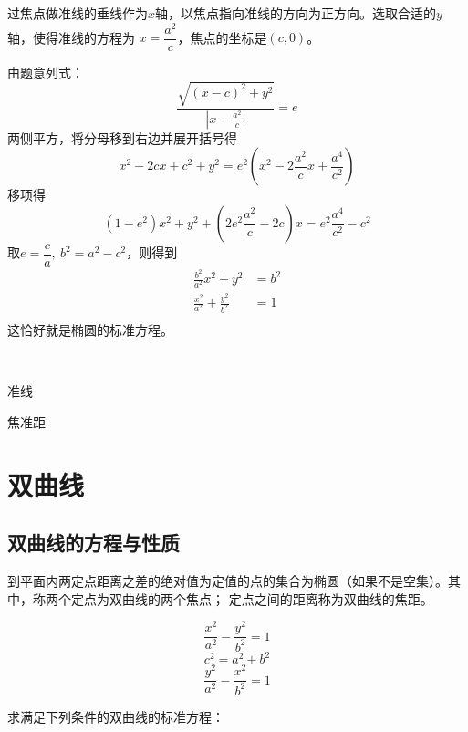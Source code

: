 \begin{jie}
    过焦点做准线的垂线作为\(x\)轴，以焦点指向准线的方向为正方向。选取合适的\(y\)轴，使得准线的方程为
    \(x=\dfrac{a^2}{c}\)，焦点的坐标是\((c,0)\)。
    
    由题意列式：
       \[ \frac{\sqrt{(x-c)^2+y^2}}{\left|x-\frac{a^2}{c}\right|}=e\]
两侧平方，将分母移到右边并展开括号得
\[x^2-2cx+c^2+y^2=e^2\left(x^2-2\frac{a^2}{c}x+\frac{a^4}{c^2}\right)\]    
移项得
\[\left(1-e^2\right)x^2+y^2+\left(2e^2\frac{a^2}{c}-2c\right)x=e^2\frac{a^4}{c^2}-c^2\]
取\(e=\dfrac{c}{a},\ b^2=a^2-c^2\)，则得到
\vspace*{-0.5cm}
\begin{align*}
    \frac{b^2}{a^2}x^2+y^2&=b^2\\
    \frac{x^2}{a^2}+\frac{y^2}{b^2}&=1\\
\end{align*}
这恰好就是椭圆的标准方程。
\end{jie}
\begin{character}
    \ 
    
    准线

    焦准距
\end{character}

\begin{theorem}[焦半径公式]
    
\end{theorem}









\clearpage
\clearpage

\section{双曲线}
\subsection{双曲线的方程与性质}
\begin{definition}[双曲线的第一定义]
    到平面内两定点距离之差的绝对值为定值的点的集合为椭圆（如果不是空集）。其中，称两个定点为双曲线的两个焦点；
    定点之间的距离称为双曲线的焦距。
\end{definition}
\begin{theorem}[双曲线的标准方程]
    \begin{equation}
        \frac{x^2}{a^2}-\frac{y^2}{b^2}=1 
    \end{equation}
    \begin{equation}
        c^2=a^2+b^2
    \end{equation}
    \begin{equation}
        \frac{y^2}{a^2}-\frac{x^2}{b^2}=1 
    \end{equation}
\end{theorem}
\begin{example}
    求满足下列条件的双曲线的标准方程：
\end{example}

